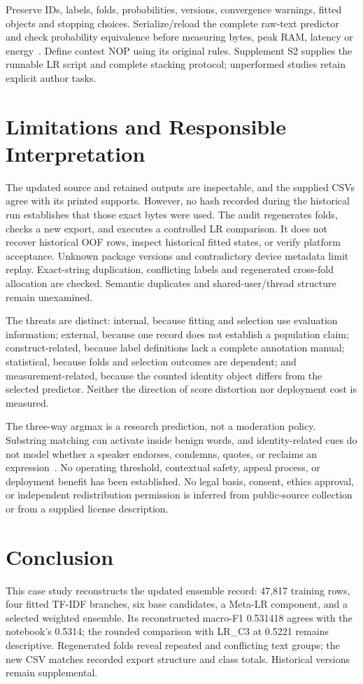 \documentclass[doublecolumn]{ijcvsplatex}
\begin{document}
Preserve IDs, labels, folds, probabilities, versions, convergence warnings, fitted objects and stopping choices. Serialize/reload the complete raw-text predictor and check probability equivalence before measuring bytes, peak RAM, latency or energy~\cite{pineau2021reproducibility}. Define contest NOP using its original rules. Supplement S2 supplies the runnable LR script and complete stacking protocol; unperformed studies retain explicit author tasks.

\section{Limitations and Responsible Interpretation}
\label{sec:limitations}
The updated source and retained outputs are inspectable, and the supplied CSVs agree with its printed supports. However, no hash recorded during the historical run establishes that those exact bytes were used. The audit regenerates folds, checks a new export, and executes a controlled LR comparison. It does not recover historical OOF rows, inspect historical fitted states, or verify platform acceptance. Unknown package versions and contradictory device metadata limit replay. Exact-string duplication, conflicting labels and regenerated cross-fold allocation are checked. Semantic duplicates and shared-user/thread structure remain unexamined.

The threats are distinct: internal, because fitting and selection use evaluation information; external, because one record does not establish a population claim; construct-related, because label definitions lack a complete annotation manual; statistical, because folds and selection outcomes are dependent; and measurement-related, because the counted identity object differs from the selected predictor. Neither the direction of score distortion nor deployment cost is measured.

The three-way argmax is a research prediction, not a moderation policy. Substring matching can activate inside benign words, and identity-related cues do not model whether a speaker endorses, condemns, quotes, or reclaims an expression~\cite{blodgett2020language,rottger2021hatecheck}. No operating threshold, contextual safety, appeal process, or deployment benefit has been established. No legal basis, consent, ethics approval, or independent redistribution permission is inferred from public-source collection or from a supplied license description.

\section{Conclusion}
\label{sec:conclusion}
This case study reconstructs the updated ensemble record: 47,817 training rows, four fitted TF-IDF branches, six base candidates, a Meta-LR component, and a selected weighted ensemble. Its reconstructed macro-F1 0.531418 agrees with the notebook's 0.5314; the rounded comparison with LR\_C3 at 0.5221 remains descriptive. Regenerated folds reveal repeated and conflicting text groups; the new CSV matches recorded export structure and class totals. Historical versions remain supplemental.
\end{document}
